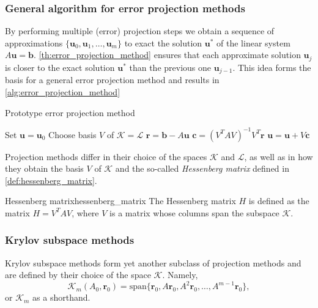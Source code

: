 \subsubsection{General algorithm for error projection methods}
By performing multiple (error) projection steps we obtain a sequence of approximations $\{\mathbf{u}_0, \mathbf{u}_1, \dots, \mathbf{u}_m\}$ to exact the solution $\mathbf{u}^*$ of the linear system $A\mathbf{u} = \mathbf{b}$. \cref{th:error_projection_method} ensures that each approximate solution $\mathbf{u}_j$ is closer to the exact solution $\mathbf{u}^*$ than the previous one $\mathbf{u}_{j-1}$. This idea forms the basis for a general error projection method and results in \cref{alg:error_projection_method}
\begin{algorithm}[H]
  \caption{Prototype error projection method \cite[Algorithm 5.1]{iter_method_saad}}
  \begin{algorithmic}
    \State Set $\mathbf{u} = \mathbf{u}_0$
    \State Choose basis $V$ of $\mathcal{K}=\mathcal{L}$
    \State $\mathbf{r} = \mathbf{b} - A \mathbf{u}$
    \State $\mathbf{c} = (V^TAV)^{-1}V^T\mathbf{r}$
    \State $\mathbf{u} = \mathbf{u} + V\mathbf{c}$
    \EndWhile
  \end{algorithmic}
  \label{alg:error_projection_method}
\end{algorithm}
Projection methods differ in their choice of the spaces $\mathcal{K}$ and $\mathcal{L}$, as well as in how they obtain the basis $V$ of $\mathcal{K}$ and the so-called \textit{Hessenberg matrix} defined in \cref{def:hessenberg_matrix}.
\begin{fancydef}{Hessenberg matrix}{hessenberg_matrix}
  The Hessenberg matrix $H$ is defined as the matrix $H = V^TAV$, where $V$ is a matrix whose columns span the subspace $\mathcal{K}$.
\end{fancydef}

\subsubsection{Krylov subspace methods}
Krylov subspace methods form yet another subclass of projection methods and are defined by their choice of the space $\mathcal{K}$. Namely,
\begin{equation}
  \mathcal{K}_m(A_0, \mathbf{r}_0) = \text{span}\{\mathbf{r}_0, A\mathbf{r}_0, A^2\mathbf{r}_0, \dots, A^{m-1}\mathbf{r}_0\},
  \label{eq:cg_krylov_space}
\end{equation}
or $\mathcal{K}_m$ as a shorthand.

